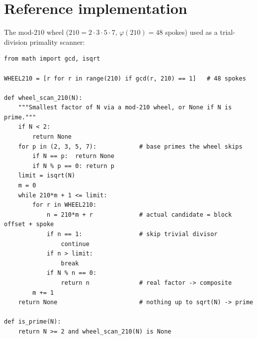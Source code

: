 \documentclass[11pt]{article}
\theoremstyle{definition}
\begin{document}
\section{Reference implementation}

The mod-$210$ wheel ($210 = 2\cdot3\cdot5\cdot7$, $\varphi(210)=48$ spokes)
used as a trial-division primality scanner:

\begin{lstlisting}
from math import gcd, isqrt

WHEEL210 = [r for r in range(210) if gcd(r, 210) == 1]   # 48 spokes

def wheel_scan_210(N):
    """Smallest factor of N via a mod-210 wheel, or None if N is prime."""
    if N < 2:
        return None
    for p in (2, 3, 5, 7):            # base primes the wheel skips
        if N == p:  return None
        if N % p == 0: return p
    limit = isqrt(N)
    m = 0
    while 210*m + 1 <= limit:
        for r in WHEEL210:
            n = 210*m + r             # actual candidate = block offset + spoke
            if n == 1:                # skip trivial divisor
                continue
            if n > limit:
                break
            if N % n == 0:
                return n              # real factor -> composite
        m += 1
    return None                       # nothing up to sqrt(N) -> prime

def is_prime(N):
    return N >= 2 and wheel_scan_210(N) is None
\end{lstlisting}
\end{document}
